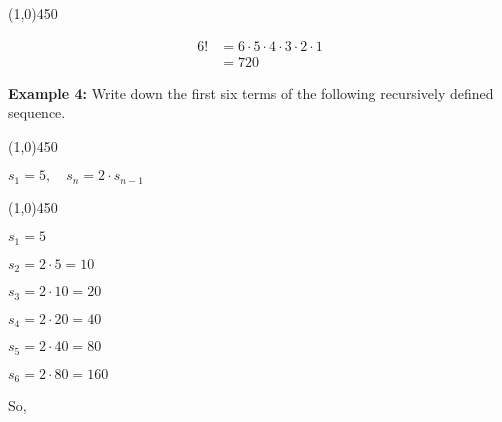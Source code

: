 \documentclass{report}
\begin{document}
\line(1,0){450}

\begin{align*}
	6! & = 6\cdot 5\cdot 4\cdot 3\cdot 2\cdot 1 \\ & =720
\end{align*}
\bigbreak \noindent \bigbreak \noindent \bigbreak \noindent

\bigbreak \noindent \bigbreak \noindent \bigbreak \noindent
\begin{center}
 \begin{large}
	  \textbf{Example 4:} 
	 Write down the first six terms of the following recursively defined sequence.
 \end{large} 
\end{center}
\bigbreak \noindent

\line(1,0){450}

\begin{center}
\begin{large}
$s_1=5, \quad s_n=2 \cdot s_{n-1}$
\end{large}
\end{center}

\line(1,0){450}

\begin{center}
 $s_1 = 5$
 \vspace{2mm}

$s_2 = 2 \cdot 5 = 10$
\vspace{2mm}

$s_3 = 2 \cdot 10 = 20$
\vspace{2mm}

$s_4 = 2 \cdot 20 = 40$
\vspace{2mm}

$s_5 = 2 \cdot 40 = 80$
\vspace{2mm}

$s_6 = 2 \cdot 80 = 160$
\end{center}

So,
\vspace{4mm}
\end{document}
